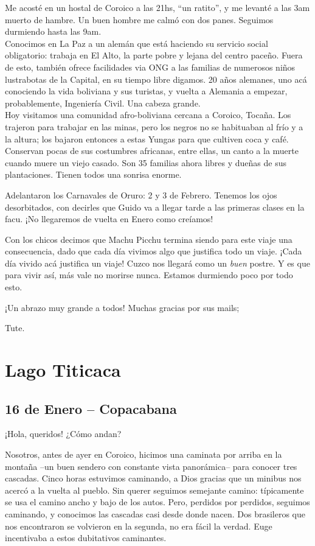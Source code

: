 Me acosté en un hostal de Coroico a las 21hs, ``un ratito'', y me levanté a
las 3am muerto de hambre. Un buen hombre me calmó con dos panes. Seguimos
durmiendo hasta las 9am.\\

Conocimos en La Paz a un alemán que está haciendo su servicio social
obligatorio: trabaja en El Alto, la parte pobre y lejana del centro paceño.
Fuera de esto, también ofrece facilidades via {\small ONG} a las
familias de numerosos niños lustrabotas de la Capital, en su tiempo libre
digamos. 20 años alemanes, uno acá conociendo la vida boliviana y sus
turistas, y vuelta a Alemania a empezar, probablemente, Ingeniería Civil. Una
cabeza grande.\\

Hoy visitamos una comunidad afro-boliviana cercana a Coroico, Tocaña. Los
trajeron para trabajar en las minas, pero los negros no se habituaban al frío y
a la altura; los bajaron entonces a estas Yungas para que cultiven coca y café.
Conservan pocas de sus costumbres africanas, entre ellas, un canto a la muerte
cuando muere un viejo casado. Son 35 familias ahora libres y dueñas de sus
plantaciones. Tienen todos una sonrisa enorme.

Adelantaron los Carnavales de Oruro: 2 y 3 de Febrero. Tenemos los ojos
desorbitados, con decirles que Guido va a llegar tarde a las primeras clases en
la facu. ¡No llegaremos de vuelta en Enero como creíamos!

Con los chicos decimos que Machu Picchu termina siendo para este viaje una
consecuencia, dado que cada día vivimos algo que justifica todo un viaje.
¡Cada día vivido acá justifica un viaje! Cuzco nos llegará
como un \emph{buen} postre. Y es que para vivir así, más vale no morirse
nunca. Estamos durmiendo poco por todo esto.

¡Un abrazo muy grande a todos! Muchas gracias por sus mails;

Tute.

\section{Lago Titicaca} \subsection*{16 de Enero -- Copacabana}

¡Hola, queridos! ¿Cómo andan?

Nosotros, antes de ayer en Coroico, hicimos una caminata por arriba en la
montaña --un buen sendero con constante vista panorámica-- para conocer tres
cascadas. Cinco horas estuvimos caminando, a Dios gracias que un minibus nos
acercó a la vuelta al pueblo. Sin querer seguimos semejante camino:
típicamente se usa el camino ancho y bajo de los autos. Pero, perdidos por
perdidos, seguimos caminando, y conocimos las cascadas casi desde donde nacen.
Dos brasileros que nos encontraron se volvieron en la segunda, no era fácil la
verdad. Euge incentivaba a estos dubitativos caminantes.\\

